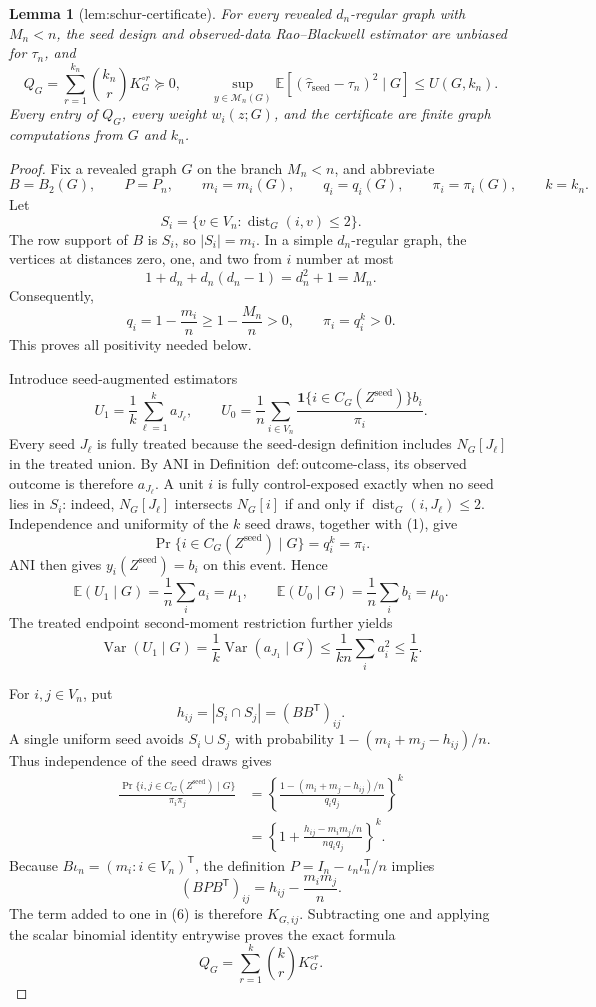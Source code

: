 \documentclass{article}
\newtheorem{lemma}{Lemma}
\begin{document}
\begin{lemma}[lem:schur-certificate]\label{lem:schur-certificate}
For every revealed \(d_n\)-regular graph with \(M_n<n\), the seed design and observed-data Rao--Blackwell estimator are unbiased for \(\tau_n\), and \[Q_G=\sum_{r=1}^{k_n}\binom{k_n}{r}K_G^{\circ r}\succeq0,\qquad \sup_{y\in\mathcal M_n(G)}\mathbb E[(\widehat\tau_{\mathrm{seed}}-\tau_n)^2\mid G]\le U(G,k_n).\] Every entry of \(Q_G\), every weight \(w_i(z;G)\), and the certificate are finite graph computations from \(G\) and \(k_n\).
\end{lemma}
\begin{proof}
Fix a revealed graph \(G\) on the branch \(M_n<n\), and abbreviate
\[
B=B_2(G),\qquad P=P_n,\qquad m_i=m_i(G),\qquad
q_i=q_i(G),\qquad \pi_i=\pi_i(G),\qquad k=k_n.
\]
Let
\[
S_i=\{v\in V_n:\operatorname{dist}_G(i,v)\le 2\}.
\]
The row support of \(B\) is \(S_i\), so \(|S_i|=m_i\).  In a simple
\(d_n\)-regular graph, the vertices at distances zero, one, and two from
\(i\) number at most
\[
1+d_n+d_n(d_n-1)=d_n^2+1=M_n.
\]
Consequently,
\[
q_i=1-\frac{m_i}{n}\ge 1-\frac{M_n}{n}>0,
\qquad
\pi_i=q_i^k>0.
\tag{1}
\]
This proves all positivity needed below.

Introduce seed-augmented estimators
\[
U_1=\frac1k\sum_{\ell=1}^k a_{J_\ell},
\qquad
U_0=\frac1n\sum_{i\in V_n}
\frac{\mathbf 1\{i\in C_G(Z^{\mathrm{seed}})\}b_i}{\pi_i}.
\tag{2}
\]
Every seed \(J_\ell\) is fully treated because the seed-design definition
includes \(N_G[J_\ell]\) in the treated union.  By ANI in
Definition~\(\mathrm{def{:}outcome\mbox{-}class}\), its observed outcome is
therefore \(a_{J_\ell}\).  A unit \(i\) is fully control-exposed exactly when
no seed lies in \(S_i\): indeed, \(N_G[J_\ell]\) intersects \(N_G[i]\) if
and only if \(\operatorname{dist}_G(i,J_\ell)\le2\).  Independence and
uniformity of the \(k\) seed draws, together with (1), give
\[
\Pr\{i\in C_G(Z^{\mathrm{seed}})\mid G\}=q_i^k=\pi_i.
\tag{3}
\]
ANI then gives \(y_i(Z^{\mathrm{seed}})=b_i\) on this event.  Hence
\[
\mathbb E(U_1\mid G)=\frac1n\sum_i a_i=\mu_1,
\qquad
\mathbb E(U_0\mid G)=\frac1n\sum_i b_i=\mu_0.
\tag{4}
\]
The treated endpoint second-moment restriction further yields
\[
\operatorname{Var}(U_1\mid G)
=\frac1k\operatorname{Var}(a_{J_1}\mid G)
\le \frac1{kn}\sum_i a_i^2
\le \frac1k.
\tag{5}
\]

For \(i,j\in V_n\), put
\[
h_{ij}=|S_i\cap S_j|=(BB^{\mathsf T})_{ij}.
\]
A single uniform seed avoids \(S_i\cup S_j\) with probability
\(1-(m_i+m_j-h_{ij})/n\).  Thus independence of the seed draws gives
\[
\begin{aligned}
\frac{\Pr\{i,j\in C_G(Z^{\mathrm{seed}})\mid G\}}{\pi_i\pi_j}
&=\left\{\frac{1-(m_i+m_j-h_{ij})/n}{q_iq_j}\right\}^{k}\\
&=\left\{1+\frac{h_{ij}-m_im_j/n}{nq_iq_j}\right\}^{k}.
\end{aligned}
\tag{6}
\]
Because \(B\iota_n=(m_i:i\in V_n)^{\mathsf T}\), the definition
\(P=I_n-\iota_n\iota_n^{\mathsf T}/n\) implies
\[
(BPB^{\mathsf T})_{ij}=h_{ij}-\frac{m_im_j}{n}.
\]
The term added to one in (6) is therefore \(K_{G,ij}\).  Subtracting one
and applying the scalar binomial identity entrywise proves the exact formula
\[
Q_G=\sum_{r=1}^{k}\binom{k}{r}K_G^{\circ r}.
\tag{7}
\]


\end{proof}
\end{document}
